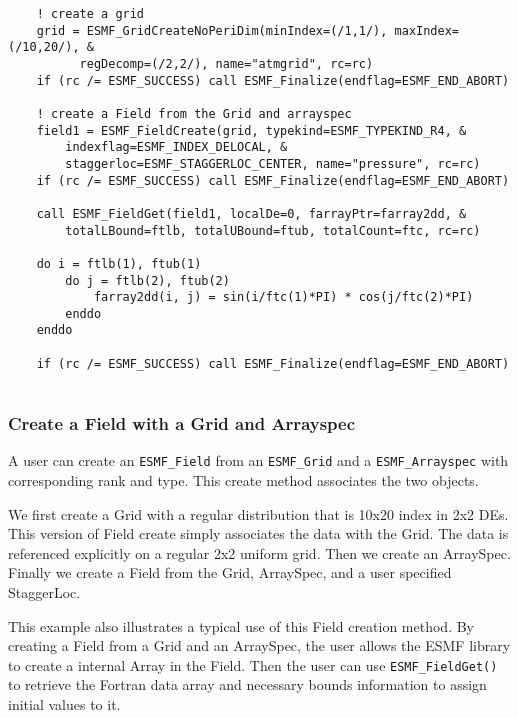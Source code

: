  \begin{verbatim}
    ! create a grid
    grid = ESMF_GridCreateNoPeriDim(minIndex=(/1,1/), maxIndex=(/10,20/), &
          regDecomp=(/2,2/), name="atmgrid", rc=rc)
    if (rc /= ESMF_SUCCESS) call ESMF_Finalize(endflag=ESMF_END_ABORT)

    ! create a Field from the Grid and arrayspec
    field1 = ESMF_FieldCreate(grid, typekind=ESMF_TYPEKIND_R4, &
        indexflag=ESMF_INDEX_DELOCAL, &
        staggerloc=ESMF_STAGGERLOC_CENTER, name="pressure", rc=rc)
    if (rc /= ESMF_SUCCESS) call ESMF_Finalize(endflag=ESMF_END_ABORT)

    call ESMF_FieldGet(field1, localDe=0, farrayPtr=farray2dd, &
        totalLBound=ftlb, totalUBound=ftub, totalCount=ftc, rc=rc)

    do i = ftlb(1), ftub(1)
        do j = ftlb(2), ftub(2)
            farray2dd(i, j) = sin(i/ftc(1)*PI) * cos(j/ftc(2)*PI)
        enddo
    enddo

    if (rc /= ESMF_SUCCESS) call ESMF_Finalize(endflag=ESMF_END_ABORT)
 
\end{verbatim}
 

  \subsubsection{Create a Field with a Grid and Arrayspec}
  \label{sec:field:usage:create_grid_arrayspec}
  
    A user can create an {\tt ESMF\_Field} from an {\tt ESMF\_Grid} and a
    {\tt ESMF\_Arrayspec} with corresponding rank and type.
    This create method associates the two objects.
  
    We first create a Grid with a regular distribution that is
    10x20 index in 2x2 DEs.  This version of Field create simply
    associates the data with the Grid.  The data is referenced
    explicitly on a regular 2x2 uniform grid.
    Then we create an ArraySpec.  Finally we create a Field from
    the Grid, ArraySpec, and a user specified StaggerLoc.
  
    This example also illustrates a typical use of this Field creation
    method. By creating a Field from a Grid and an ArraySpec, the
    user allows the ESMF library to create a internal Array in the Field.
    Then the user can use {\tt ESMF\_FieldGet()} to retrieve the Fortran
    data array
    and necessary bounds information to assign initial values to it. 

